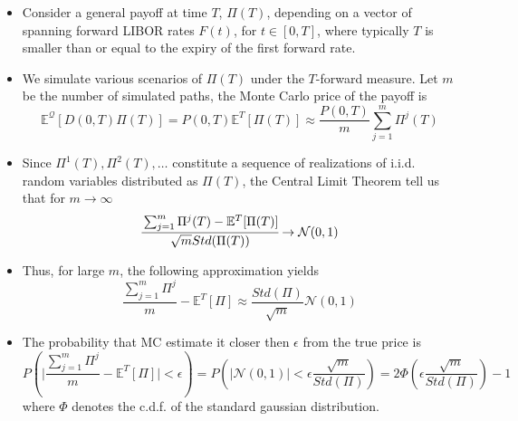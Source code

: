 \documentclass{beamer}
\begin{document}
\begin{frame}
\begin{itemize}
\item Consider a general payoff at time $T$, $\Pi(T)$, depending on a vector of spanning forward LIBOR rates $F(t)$, for $t \in [0, T]$, where typically $T$ is smaller than or equal to the expiry of the first forward rate.
\item We simulate various scenarios of $\Pi(T)$ under the $T$-forward measure. Let $m$ be the number of simulated paths, the Monte Carlo price of the payoff is
\begin{equation*}
\mathbb{E}^\mathcal{Q}[D(0,T)\Pi(T)] = P(0,T)\mathbb{E}^T[\Pi(T)]\approx \frac{P(0,T)}{m}\sum_{j=1}^{m}\Pi^j(T)
\end{equation*}
\item Since $\Pi^1(T), \Pi^2(T),\ldots$ constitute a sequence of realizations of i.i.d. random variables distributed as $\Pi(T)$, the Central Limit Theorem tell us that for $m\rightarrow\infty$
\begin{equation*}
\cfrac{\sum_{j=1}^{m}\Pi^j(T)-\mathbb{E}^T[\Pi(T)]}{\sqrt{m} Std(\Pi(T))}\rightarrow \mathcal{N}(0,1)
\end{equation*}
\end{itemize}
\end{frame}

\begin{frame}
\begin{itemize}
\item Thus, for large $m$, the following approximation yields
\begin{equation*}
\frac{\sum_{j=1}^{m}\Pi^j}{m}-\mathbb{E}^T[\Pi]\approx \frac{Std(\Pi)}{\sqrt{m}}\mathcal{N}(0,1)
\end{equation*}
\item The probability that MC estimate it closer then $\epsilon$ from the true price is
\begin{equation*}
P\left(\big|\frac{\sum_{j=1}^m\Pi^j}{m}-\mathbb{E}^T[\Pi]\big|<\epsilon\right) = P\left(|\mathcal{N}(0,1)|<\epsilon\frac{\sqrt{m}}{Std(\Pi)}\right) =
2\Phi\left(\epsilon\frac{\sqrt{m}}{Std(\Pi)}\right)-1
\end{equation*}
where $\Phi$ denotes the c.d.f. of the standard gaussian distribution.
\end{itemize}
\end{frame}
\end{document}
